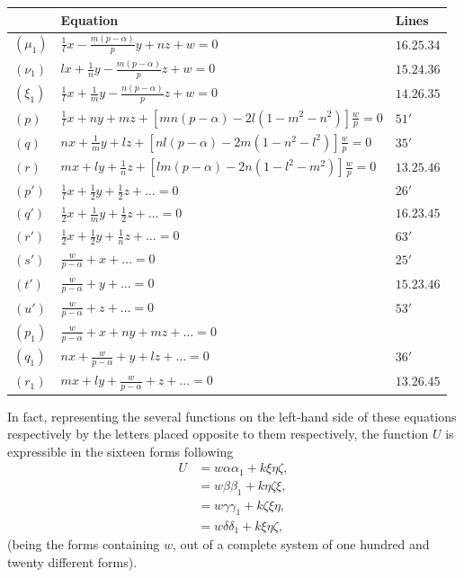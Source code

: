 \documentclass[11pt,a4paper]{book}
\begin{document}
\begin{table}[h]
\centering
\begin{tabular}{@{}lll@{}}
\toprule
& Equation & Lines \\
\midrule
$(\mu_{1})$ & $\frac{1}{l}x - \frac{m(p-\alpha)}{p}y + nz + w = 0$ & $16.25.34$ \\
$(\nu_{1})$ & $lx + \frac{1}{n}y - \frac{m(p-\alpha)}{p}z + w = 0$ & $15.24.36$ \\
$(\xi_{1})$ & $\frac{1}{l}x + \frac{1}{m}y - \frac{n(p-\alpha)}{p}z + w = 0$ & $14.26.35$ \\
$(p)$ & $\frac{1}{l}x + ny + mz + [mn(p-\alpha) - 2l(1-m^{2}-n^{2})]\frac{w}{p} = 0$ & $51'$ \\
$(q)$ & $nx + \frac{1}{m}y + lz + [nl(p-\alpha) - 2m(1-n^{2}-l^{2})]\frac{w}{p} = 0$ & $35'$ \\
$(r)$ & $mx + ly + \frac{1}{n}z + [lm(p-\alpha) - 2n(1-l^{2}-m^{2})]\frac{w}{p} = 0$ & $13.25.46$ \\
$(p')$ & $\frac{1}{l}x + \frac{1}{2}y + \frac{1}{2}z + \ldots = 0$ & $26'$ \\
$(q')$ & $\frac{1}{2}x + \frac{1}{m}y + \frac{1}{2}z + \ldots = 0$ & $16.23.45$ \\
$(r')$ & $\frac{1}{2}x + \frac{1}{2}y + \frac{1}{n}z + \ldots = 0$ & $63'$ \\
$(s')$ & $\frac{w}{p-\alpha} + x + \ldots = 0$ & $25'$ \\
$(t')$ & $\frac{w}{p-\alpha} + y + \ldots = 0$ & $15.23.46$ \\
$(u')$ & $\frac{w}{p-\alpha} + z + \ldots = 0$ & $53'$ \\
$(p_{1})$ & $\frac{w}{p-\alpha} + x + ny + mz + \ldots = 0$ & \\
$(q_{1})$ & $nx + \frac{w}{p-\alpha} + y + lz + \ldots = 0$ & $36'$ \\
$(r_{1})$ & $mx + ly + \frac{w}{p-\alpha} + z + \ldots = 0$ & $13.26.45$ \\
\bottomrule
\end{tabular}
\end{table}

In fact, representing the several functions on the left-hand side of these equations respectively by the letters placed opposite to them respectively, the function $U$ is expressible in the sixteen forms following
\begin{align*}
U &= w\alpha\alpha_{1} + k\xi\eta\zeta, \\
&= w\beta\beta_{1} + k\eta\zeta\xi, \\
&= w\gamma\gamma_{1} + k\zeta\xi\eta, \\
&= w\delta\delta_{1} + k\xi\eta\zeta,
\end{align*}
(being the forms containing $w$, out of a complete system of one hundred and twenty different forms).
\end{document}
